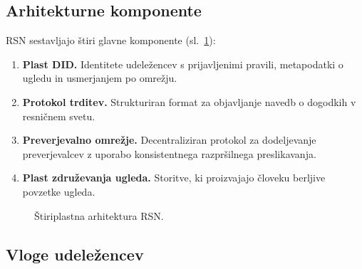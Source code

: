 \documentclass[11pt,a4paper,twocolumn]{article}
\begin{document}
\subsection{Arhitekturne komponente}

RSN sestavljajo štiri glavne komponente (sl.~\ref{fig:architecture}):
\begin{enumerate}[nosep]
\item \textbf{Plast DID.} Identitete udeležencev s prijavljenimi pravili, metapodatki o ugledu in usmerjanjem po omrežju.
\item \textbf{Protokol trditev.} Strukturiran format za objavljanje navedb o dogodkih v resničnem svetu.
\item \textbf{Preverjevalno omrežje.} Decentraliziran protokol za dodeljevanje preverjevalcev z uporabo konsistentnega razpršilnega preslikavanja.
\item \textbf{Plast združevanja ugleda.} Storitve, ki proizvajajo človeku berljive povzetke ugleda.
\end{enumerate}

\begin{figure}[ht]
\centering
{}
\caption{Štiriplastna arhitektura RSN.}
\label{fig:architecture}
\end{figure}

\subsection{Vloge udeležencev}
\end{document}
